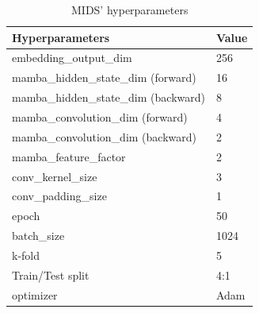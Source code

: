 \documentclass[lettersize,journal]{IEEEtran}
\begin{document}
\begin{table}[!ht]
\caption{MIDS' hyperparameters}
\label{tab3}
\begin{center}
\renewcommand{\arraystretch}{1.2} %
\begin{tabular}{ll}
\hline
\textbf{Hyperparameters} & \textbf{Value} \\
\hline
embedding\_output\_dim                       & 256 \\
mamba\_hidden\_state\_dim (forward)          & 16  \\
mamba\_hidden\_state\_dim (backward)         & 8   \\
mamba\_convolution\_dim (forward)            & 4   \\
mamba\_convolution\_dim (backward)           & 2   \\
mamba\_feature\_factor                       & 2   \\
conv\_kernel\_size                           & 3   \\
conv\_padding\_size                          & 1   \\
epoch                                        & 50  \\
batch\_size                                  & 1024 \\
k-fold                                       & 5   \\
Train/Test split                             & 4:1 \\
optimizer                                    & Adam \\
\hline
\end{tabular}
\end{center}
\end{table}
\end{document}

